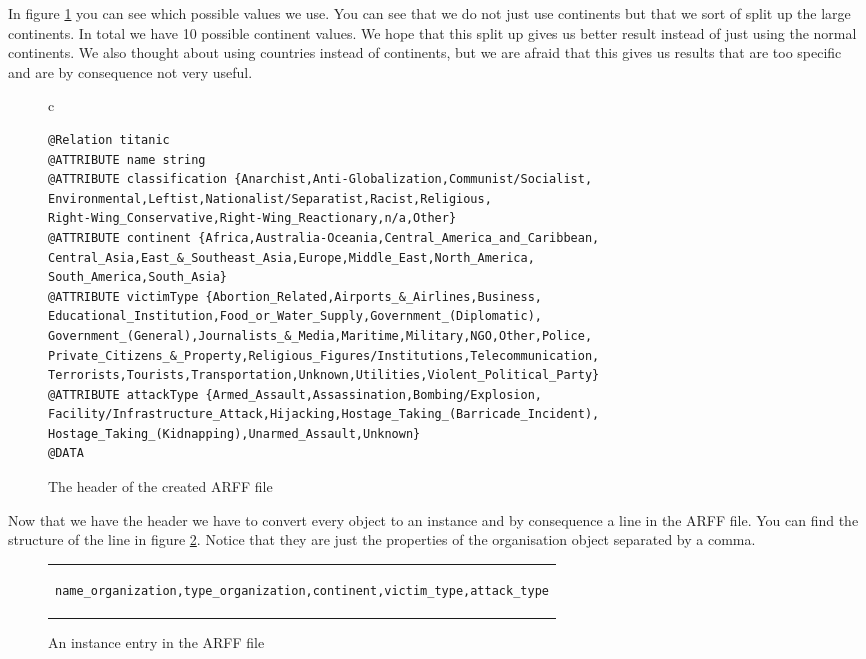 \documentclass[a4]{article}
\begin{document}
In figure \ref{fig:arff_header} you can see which possible values we use. You can see that we do not just use continents but that we sort of split up the large continents. In total we have 10 possible continent values. We hope that this split up gives us better result instead of just using the normal continents. We also thought about using countries instead of continents, but we are afraid that this gives us results that are too specific and are by consequence not very useful.\par
\begin{figure}[!h]
\centering
\begin{tabular}{c}
\begin{lstlisting}
@Relation titanic
@ATTRIBUTE name string
@ATTRIBUTE classification {Anarchist,Anti-Globalization,Communist/Socialist,
Environmental,Leftist,Nationalist/Separatist,Racist,Religious,
Right-Wing_Conservative,Right-Wing_Reactionary,n/a,Other}
@ATTRIBUTE continent {Africa,Australia-Oceania,Central_America_and_Caribbean,
Central_Asia,East_&_Southeast_Asia,Europe,Middle_East,North_America,
South_America,South_Asia}
@ATTRIBUTE victimType {Abortion_Related,Airports_&_Airlines,Business,
Educational_Institution,Food_or_Water_Supply,Government_(Diplomatic),
Government_(General),Journalists_&_Media,Maritime,Military,NGO,Other,Police,
Private_Citizens_&_Property,Religious_Figures/Institutions,Telecommunication,
Terrorists,Tourists,Transportation,Unknown,Utilities,Violent_Political_Party}
@ATTRIBUTE attackType {Armed_Assault,Assassination,Bombing/Explosion,
Facility/Infrastructure_Attack,Hijacking,Hostage_Taking_(Barricade_Incident),
Hostage_Taking_(Kidnapping),Unarmed_Assault,Unknown}
@DATA
\end{lstlisting}
\end{tabular}
\caption{The header of the created ARFF file}
\label{fig:arff_header}
\end{figure}
\par
Now that we have the header we have to convert every object to an instance and by consequence a line in the ARFF file. You can find the structure of the line in figure \ref{fig:entry}. Notice that they are just the properties of the organisation object separated by a comma.\par
\begin{figure}[!h]
\centering
\begin{tabular}{c}
\begin{lstlisting}
name_organization,type_organization,continent,victim_type,attack_type
\end{lstlisting}
\end{tabular}
\caption{An instance entry in the ARFF file}
\label{fig:entry}
\end{figure}
\end{document}
